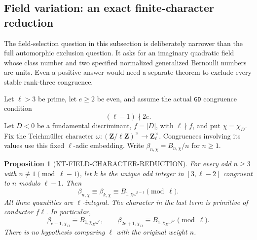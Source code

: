\documentclass[11pt,a4paper]{article}
\newtheorem{proposition}[theorem]{Proposition}
\theoremstyle{definition}
\begin{document}
\subsection{Field variation: an exact finite-character reduction}
\label{sec:kt-field-variation}

The field-selection question in this subsection is deliberately narrower
than the full automorphic exclusion question.  It asks for an imaginary
quadratic field whose class number and two specified normalized
generalized Bernoulli numbers are units.  Even a positive answer would
need a separate theorem to exclude every stable rank-three congruence.

Let $\ell>3$ be prime, let $e\geq2$ be even, and assume the actual
\texttt{GD} congruence condition
\[
                         (\ell-1)\nmid 2e.                 \tag{FV.1}
\]
Let $D<0$ be a fundamental discriminant, $f=|D|$, with $\ell\nmid f$,
and put $\chi=\chi_D$.  Fix the Teichm\"uller character
$\omega:(\mathbf Z/\ell\mathbf Z)^\times\to\mathbf Z_\ell^\times$.
Congruences involving its values use this fixed $\ell$-adic embedding.
Write $\beta_{n,\chi}=B_{n,\chi}/n$ for $n\geq1$.

\begin{proposition}[KT-FIELD-CHARACTER-REDUCTION]
For every odd $n\geq3$ with $n\not\equiv1\pmod{\ell-1}$, let $k$ be
the unique odd integer in $[3,\ell-2]$ congruent to $n$ modulo
$\ell-1$.  Then
\[
 \beta_{n,\chi}\equiv\beta_{k,\chi}
       \equiv B_{1,\chi\omega^{k-1}}\pmod\ell.              \tag{FV.2}
\]
All three quantities are $\ell$-integral.  The character in the last
term is primitive of conductor $f\ell$.  In particular,
\[
 \beta_{e+1,\chi_D}\equiv B_{1,\chi_D\omega^e},\qquad
 \beta_{2e+1,\chi_D}\equiv B_{1,\chi_D\omega^{2e}}
                                      \pmod\ell.           \tag{FV.3}
\]
There is no hypothesis comparing $\ell$ with the original weight $n$.
\end{proposition}
\end{document}
